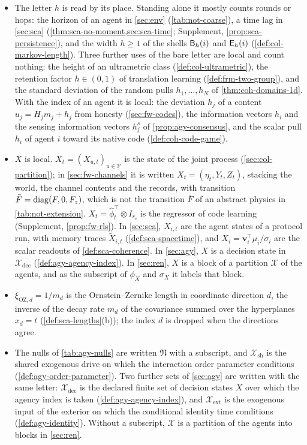 \begin{itemize}
\item The letter $h$ is read by its place. Standing alone it mostly counts rounds or hops: the horizon of an agent in \cref{sec:env} (\cref{tab:not-coarse}), a time lag in \cref{sec:sca} (\cref{thm:sca-no-moment,sec:sca-time}; Supplement, \cref{prop:sca-persistence}), and the width $h\ge1$ of the shells $\mathsf{B}_h(i)$ and $\mathsf{E}_h(i)$ (\cref{def:col-markov-length}). Three further uses of the bare letter are local and count nothing: the height of an ultrametric class (\cref{def:col-ultrametric}), the retention factor $h\in(0,1)$ of translation learning (\cref{def:frm-two-group}), and the standard deviation of the random pulls $h_1,\dots,h_N$ of \cref{thm:coh-domains-1d}. With the index of an agent it is local: the deviation $h_j$ of a content $u_j=H_jm_j+h_j$ from honesty (\cref{sec:fw-codes}), the information vectors $h_i$ and the sensing information vectors $h^s_j$ of \cref{prop:agy-consensus}, and the scalar pull $h_i$ of agent $i$ toward its native code (\cref{def:coh-code-game}).
\item $X$ is local. $X_t=(X_{u,t})_{u\in\mathcal V}$ is the state of the joint process (\cref{sec:col-partition}); in \cref{sec:fw-channels} it is written $X_t=(\eta_t,Y_t,Z_t)$, stacking the world, the channel contents and the records, with transition $\bar F=\operatorname{diag}(F,0,F_z)$, which is not the transition $\bar F$ of an abstract physics in \cref{tab:not-extension}. $X_t=\hat\phi_t^\top\otimes I_{r_c}$ is the regressor of code learning (Supplement, \cref{prop:fw-rls}). In \cref{sec:sca}, $X_{i,t}$ are the agent states of a protocol run, with memory traces $\tilde X_{i,t}$ (\cref{def:sca-spacetime}), and $X_i=\mathbf v_i^\top\mu_i/\sigma_i$ are the scalar readouts of \cref{def:sca-coherence}. In \cref{sec:agy}, $X$ is a decision state in $\mathcal X_{\mathrm{dec}}$ (\cref{def:agy-agency-index}). In \cref{sec:ren}, $X$ is a block of a partition $\mathcal X$ of the agents, and as the subscript of $\phi_X$ and $\sigma_X$ it labels that block.
\item $\xi_{\mathrm{OZ},d}=1/m_d$ is the Ornstein--Zernike length in coordinate direction $d$, the inverse of the decay rate $m_d$ of the covariance summed over the hyperplanes $x_d=t$ (\cref{def:sca-lengths}(b)); the index $d$ is dropped when the directions agree.
\item The nulls of \cref{tab:agy-nulls} are written $\mathfrak N$ with a subscript, and $\mathcal X_{\mathrm{sh}}$ is the shared exogenous drive on which the interaction order parameter conditions (\cref{def:agy-order-parameter}). Two further sets of \cref{sec:agy} are written with the same letter: $\mathcal X_{\mathrm{dec}}$ is the declared finite set of decision states $X$ over which the agency index is taken (\cref{def:agy-agency-index}), and $\mathcal X_{\mathrm{ext}}$ is the exogenous input of the exterior on which the conditional identity time conditions (\cref{def:agy-identity}). Without a subscript, $\mathcal X$ is a partition of the agents into blocks in \cref{sec:ren}.

\end{itemize}
